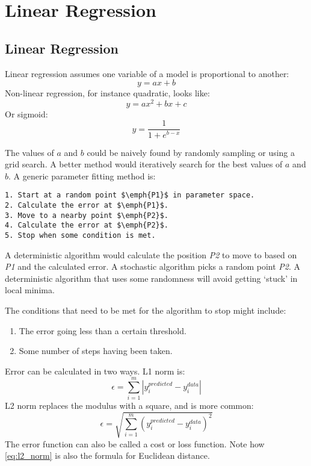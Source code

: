\chapter{Linear Regression}


\section{Linear Regression}
Linear regression assumes one variable of a model is proportional to another:
\begin{equation}
    \label{eq:linear_regression}
    y = ax + b
\end{equation}
Non-linear regression, for instance quadratic, looks like:
\begin{equation*}
    y = ax^2 + bx + c
\end{equation*}
Or sigmoid:
\begin{equation*}
    y = \frac{1}{1 + e ^{b-x}}
\end{equation*}

The values of \(a\) and \(b\) could be naively found by randomly sampling or using a grid search. A better method would iteratively search for the best values of \(a\) and \(b\). A generic parameter fitting method is:
\begin{lstlisting}
1. Start at a random point $\emph{P1}$ in parameter space.
2. Calculate the error at $\emph{P1}$.
3. Move to a nearby point $\emph{P2}$.
4. Calculate the error at $\emph{P2}$.
5. Stop when some condition is met.
\end{lstlisting}
A deterministic algorithm would calculate the position \emph{P2} to move to based on \emph{P1} and the calculated error. A stochastic algorithm picks a random point \emph{P2}. A deterministic algorithm that uses some randomness will avoid getting `stuck' in local minima.

The conditions that need to be met for the algorithm to stop might include:
\begin{enumerate}
    \item The error going less than a certain threshold.
    \item Some number of steps having been taken.
\end{enumerate}

Error can be calculated in two ways. L1 norm is:
\begin{equation*}
    \epsilon = \sum_{i=1}^{m}|y_i^{predicted} - y_i^{data}|
\end{equation*}
L2 norm replaces the modulus with a square, and is more common:
\begin{equation}
    \label{eq:l2_norm}
    \epsilon = \sqrt{\sum_{i=1}^{m}(y_i^{predicted} - y_i^{data})^2}
\end{equation}
The error function can also be called a cost or loss function. Note how \ref*{eq:l2_norm} is also the formula for Euclidean distance.

